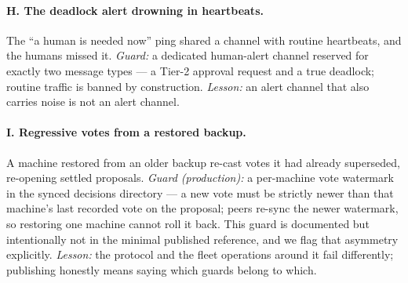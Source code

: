 \documentclass[11pt]{article}
\begin{document}
\paragraph{H. The deadlock alert drowning in heartbeats.} The ``a human is needed now'' ping shared a channel with routine heartbeats, and the humans missed it. \emph{Guard:} a dedicated human-alert channel reserved for exactly two message types --- a Tier-2 approval request and a true deadlock; routine traffic is banned by construction. \emph{Lesson:} an alert channel that also carries noise is not an alert channel.

\paragraph{I. Regressive votes from a restored backup.} A machine restored from an older backup re-cast votes it had already superseded, re-opening settled proposals. \emph{Guard (production):} a per-machine vote watermark in the synced decisions directory --- a new vote must be strictly newer than that machine's last recorded vote on the proposal; peers re-sync the newer watermark, so restoring one machine cannot roll it back. This guard is documented but intentionally not in the minimal published reference, and we flag that asymmetry explicitly. \emph{Lesson:} the protocol and the fleet operations around it fail differently; publishing honestly means saying which guards belong to which.
\end{document}
